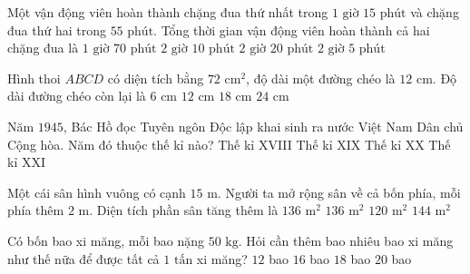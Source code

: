 \begin{ex} %
Một vận động viên hoàn thành chặng đua thứ nhất trong $1\text{ giờ } 15\text{ phút}$ và chặng đua thứ hai trong $55\text{ phút}$. Tổng thời gian vận động viên hoàn thành cả hai chặng đua là
\choice
{$1\text{ giờ } 70\text{ phút}$}
{\True $2\text{ giờ } 10\text{ phút}$}
{$2\text{ giờ } 20\text{ phút}$}
{$2\text{ giờ } 5\text{ phút}$}
\end{ex}

\begin{ex} %
Hình thoi $ABCD$ có diện tích bằng $72\text{ cm}^2$, độ dài một đường chéo là $12\text{ cm}$. Độ dài đường chéo còn lại là
\choice
{$6\text{ cm}$}
{\True $12\text{ cm}$}
{$18\text{ cm}$}
{$24\text{ cm}$}
\end{ex}

\begin{ex} %
Năm $1945$, Bác Hồ đọc Tuyên ngôn Độc lập khai sinh ra nước Việt Nam Dân chủ Cộng hòa. Năm đó thuộc thế kỉ nào?
\choice
{Thế kỉ XVIII}
{Thế kỉ XIX}
{\True Thế kỉ XX}
{Thế kỉ XXI}
\end{ex}

\begin{ex} %
Một cái sân hình vuông có cạnh $15\text{ m}$. Người ta mở rộng sân về cả bốn phía, mỗi phía thêm $2\text{ m}$. Diện tích phần sân tăng thêm là
\choice
{$136\text{ m}^2$}
{\True $136\text{ m}^2$}
{$120\text{ m}^2$}
{$144\text{ m}^2$}
\end{ex}

\begin{ex} %
Có bốn bao xi măng, mỗi bao nặng $50\text{ kg}$. Hỏi cần thêm bao nhiêu bao xi măng như thế nữa để được tất cả $1\text{ tấn}$ xi măng?
\choice
{$12$ bao}
{\True $16$ bao}
{$18$ bao}
{$20$ bao}
\end{ex}

